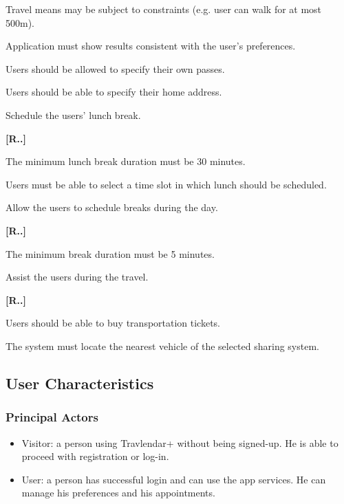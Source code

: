 \begin{list}
\begin{list}
		\item Travel means may be subject to constraints (e.g. user can walk for at most 500m).
		\item Application must show results consistent with the user’s preferences.
		\item Users should be allowed to specify their own passes.
		\item Users should be able to specify their home address.
    \end{list}
    \item Schedule the users’ lunch break.
    \begin{list}
	{\bfseries{}[R..]~}
	{
	}
        \item The minimum lunch break duration must be 30 minutes. 
		\item Users must be able to select a time slot in which lunch should be scheduled.

    \end{list}
    \item Allow the users to schedule breaks during the day.
    \begin{list}
	{\bfseries{}[R..]~}
	{
	}
        \item The minimum break duration must be 5 minutes.
    \end{list}
    \item Assist the users during the travel.
    \begin{list}
	{\bfseries{}[R..]~}
	{
	}
	\item Users should be able to buy transportation tickets.
	\item The system must locate the nearest vehicle of the selected sharing system. 
	\end{list}
\end{list}

\subsection{User Characteristics}

\subsubsection{Principal Actors}

\renewcommand{\labelitemi}{$-$}
\begin{itemize}
\item
Visitor: a person using Travlendar+ without being signed-up. He is able to proceed with registration or log-in.
\item
User: a person has successful login and can use the app services. He can manage his preferences and his appointments.
\end{itemize}

